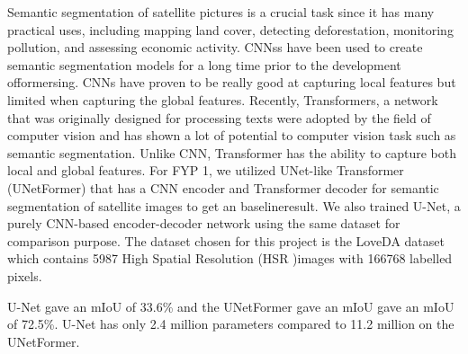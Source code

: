 
Semantic segmentation of satellite pictures is a crucial task since it has many practical uses, including mapping land cover, detecting deforestation, monitoring pollution, and assessing economic activity. CNNss have been used to create semantic segmentation models for a long time prior to the development offormersing. CNNs have proven to be really good at capturing local features but limited when capturing the global features. Recently, Transformers, a network that was originally designed for processing texts were adopted by the field of computer vision and has shown a lot of potential to computer vision task such as semantic segmentation. Unlike CNN, Transformer has the ability to capture both local and global features. For FYP 1, we utilized UNet-like Transformer (UNetFormer) that has a CNN encoder and Transformer decoder for semantic segmentation of satellite images to get an baselineresult. We also trained  U-Net, a purely CNN-based encoder-decoder network using the same dataset for comparison purpose. The dataset chosen for this project is the LoveDA dataset which contains 5987 High Spatial Resolution (HSR )images with 166768 labelled pixels.

U-Net gave an mIoU of 33.6\% and the UNetFormer gave an mIoU gave an mIoU of 72.5\%. U-Net has only 2.4 million parameters compared to 11.2 million on the UNetFormer.

